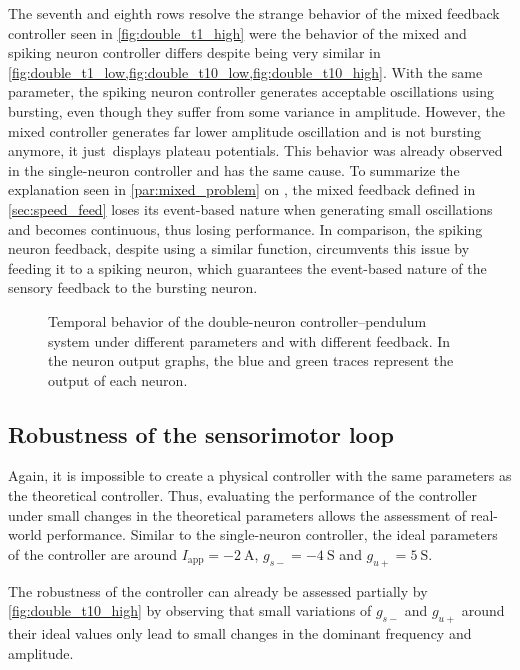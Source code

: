 The seventh and eighth rows resolve the strange behavior of the mixed feedback controller seen in \cref{fig:double_t1_high} were the behavior of the mixed and spiking neuron controller differs despite being very similar in \cref{fig:double_t1_low,fig:double_t10_low,fig:double_t10_high}.
With the same parameter, the spiking neuron controller generates acceptable oscillations using bursting, even though they suffer from some variance in amplitude. However, the mixed controller generates far lower amplitude oscillation and is not bursting anymore, it just displays plateau potentials.
This behavior was already observed in the single-neuron controller and has the same cause.
To summarize the explanation seen in \cref{par:mixed_problem} on , the mixed feedback defined in \cref{sec:speed_feed} loses its event-based nature when generating small oscillations and becomes continuous, thus losing performance.
In comparison, the spiking neuron feedback, despite using a similar function, circumvents this issue by feeding it to a spiking neuron, which guarantees the event-based nature of the sensory feedback to the bursting neuron.

\begin{figure}[!htbp]
    \centering
    \caption{Temporal behavior of the double-neuron controller–pendulum system under different parameters and with different feedback. In the neuron output graphs, the blue and green traces represent the output of each neuron.}
    \label{fig:double_control_traces}
\end{figure}

\subsection{Robustness of the sensorimotor loop}

Again, it is impossible to create a physical controller with the same parameters as the theoretical controller.
Thus, evaluating the performance of the controller under small changes in the theoretical parameters allows the assessment of real-world performance.
Similar to the single-neuron controller, the ideal parameters of the controller are around $I_\text{app} = \qty{-2}{\ampere}$, $g_{s-} = \qty{-4}{\siemens}$ and $g_{u+} = \qty{5}{\siemens}$. 

The robustness of the controller can already be assessed partially by \cref{fig:double_t10_high} by observing that small variations of $g_{s-}$ and $g_{u+}$ around their ideal values only lead to small changes in the dominant frequency and amplitude.

